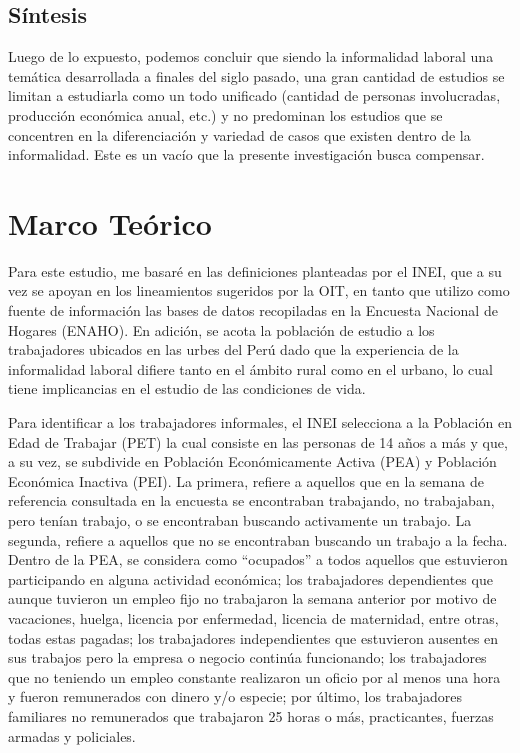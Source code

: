 \documentclass[
  letterpaper,
  12pt,
  oneside,
  spanish,
  doublespacing,
  headsepline,
  parskip]{MastersDoctoralThesis}
\begin{document}
\hypertarget{suxedntesis}{%
\section{Síntesis}\label{suxedntesis}}

Luego de lo expuesto, podemos concluir que siendo la informalidad
laboral una temática desarrollada a finales del siglo pasado, una gran
cantidad de estudios se limitan a estudiarla como un todo unificado
(cantidad de personas involucradas, producción económica anual, etc.) y
no predominan los estudios que se concentren en la diferenciación y
variedad de casos que existen dentro de la informalidad. Este es un
vacío que la presente investigación busca compensar.


\hypertarget{sec-marco}{%
\chapter{Marco Teórico}\label{sec-marco}}

Para este estudio, me basaré en las definiciones planteadas por el INEI,
que a su vez se apoyan en los lineamientos sugeridos por la OIT, en
tanto que utilizo como fuente de información las bases de datos
recopiladas en la Encuesta Nacional de Hogares (ENAHO). En adición, se
acota la población de estudio a los trabajadores ubicados en las urbes
del Perú dado que la experiencia de la informalidad laboral difiere
tanto en el ámbito rural como en el urbano, lo cual tiene implicancias
en el estudio de las condiciones de vida.

Para identificar a los trabajadores informales, el INEI selecciona a la
Población en Edad de Trabajar (PET) la cual consiste en las personas de
14 años a más y que, a su vez, se subdivide en Población Económicamente
Activa (PEA) y Población Económica Inactiva (PEI). La primera, refiere a
aquellos que en la semana de referencia consultada en la encuesta se
encontraban trabajando, no trabajaban, pero tenían trabajo, o se
encontraban buscando activamente un trabajo. La segunda, refiere a
aquellos que no se encontraban buscando un trabajo a la fecha. Dentro de
la PEA, se considera como ``ocupados'' a todos aquellos que estuvieron
participando en alguna actividad económica; los trabajadores
dependientes que aunque tuvieron un empleo fijo no trabajaron la semana
anterior por motivo de vacaciones, huelga, licencia por enfermedad,
licencia de maternidad, entre otras, todas estas pagadas; los
trabajadores independientes que estuvieron ausentes en sus trabajos pero
la empresa o negocio continúa funcionando; los trabajadores que no
teniendo un empleo constante realizaron un oficio por al menos una hora
y fueron remunerados con dinero y/o especie; por último, los
trabajadores familiares no remunerados que trabajaron 25 horas o más,
practicantes, fuerzas armadas y policiales.
\end{document}
